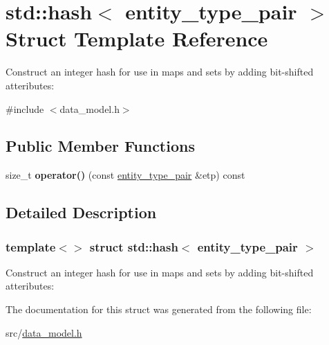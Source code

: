 \hypertarget{structstd_1_1hash_3_01entity__type__pair_01_4}{}\section{std\+:\+:hash$<$ entity\+\_\+type\+\_\+pair $>$ Struct Template Reference}
\label{structstd_1_1hash_3_01entity__type__pair_01_4}


Construct an integer hash for use in maps and sets by adding bit-\/shifted atteributes\+:  




{\ttfamily \#include $<$data\+\_\+model.\+h$>$}

\subsection*{Public Member Functions}
\begin{DoxyCompactItemize}
\item 
\mbox{\label{structstd_1_1hash_3_01entity__type__pair_01_4_a467a9a5eb3a746a32ec3c3751c24c57e}} 
size\+\_\+t {\bfseries operator()} (const \hyperlink{structtricl_1_1entity__type__pair}{entity\+\_\+type\+\_\+pair} \&etp) const
\end{DoxyCompactItemize}


\subsection{Detailed Description}
\subsubsection*{template$<$$>$\newline
struct std\+::hash$<$ entity\+\_\+type\+\_\+pair $>$}

Construct an integer hash for use in maps and sets by adding bit-\/shifted atteributes\+: 

The documentation for this struct was generated from the following file\+:\begin{DoxyCompactItemize}
\item 
src/\hyperlink{data__model_8h}{data\+\_\+model.\+h}\end{DoxyCompactItemize}
